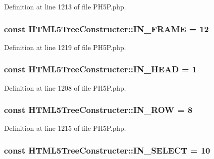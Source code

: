Definition at line 1213 of file P\+H5\+P.\+php.

\hypertarget{classHTML5TreeConstructer_aaf68c3f35587123a0dadd2a12750f279}{
\subsubsection[{I\+N\+\_\+\+F\+R\+A\+M\+E}]{\setlength{\rightskip}{0pt plus 5cm}const H\+T\+M\+L5\+Tree\+Constructer\+::\+I\+N\+\_\+\+F\+R\+A\+M\+E = 12}}\label{classHTML5TreeConstructer_aaf68c3f35587123a0dadd2a12750f279}


Definition at line 1219 of file P\+H5\+P.\+php.

\hypertarget{classHTML5TreeConstructer_a1c19225b6fc03d03d65399bbf2775ea0}{
\subsubsection[{I\+N\+\_\+\+H\+E\+A\+D}]{\setlength{\rightskip}{0pt plus 5cm}const H\+T\+M\+L5\+Tree\+Constructer\+::\+I\+N\+\_\+\+H\+E\+A\+D = 1}}\label{classHTML5TreeConstructer_a1c19225b6fc03d03d65399bbf2775ea0}


Definition at line 1208 of file P\+H5\+P.\+php.

\hypertarget{classHTML5TreeConstructer_a9f89c87246db41e99ad83c2d6d87e0b4}{
\subsubsection[{I\+N\+\_\+\+R\+O\+W}]{\setlength{\rightskip}{0pt plus 5cm}const H\+T\+M\+L5\+Tree\+Constructer\+::\+I\+N\+\_\+\+R\+O\+W = 8}}\label{classHTML5TreeConstructer_a9f89c87246db41e99ad83c2d6d87e0b4}


Definition at line 1215 of file P\+H5\+P.\+php.

\hypertarget{classHTML5TreeConstructer_ac86b82d1e3aa08473a18619a63d409e4}{
\subsubsection[{I\+N\+\_\+\+S\+E\+L\+E\+C\+T}]{\setlength{\rightskip}{0pt plus 5cm}const H\+T\+M\+L5\+Tree\+Constructer\+::\+I\+N\+\_\+\+S\+E\+L\+E\+C\+T = 10}}\label{classHTML5TreeConstructer_ac86b82d1e3aa08473a18619a63d409e4}


